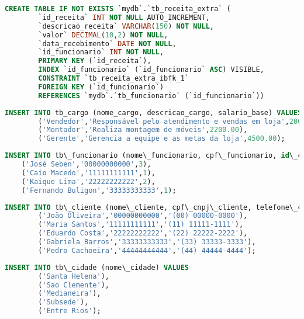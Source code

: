 \documentclass[
12pt,
a4paper,
semrecuonosumario,
sumario = abnt-6027-2012]{report}
\begin{document}
    \begin{lstlisting}[language=SQL,caption={DDL -- Tabela \texttt{tb\_receita\_extra}}]
    	CREATE TABLE IF NOT EXISTS `mydb`.`tb_receita_extra` (
    	`id_receita` INT NOT NULL AUTO_INCREMENT,
    	`descricao_receita` VARCHAR(150) NOT NULL,
    	`valor` DECIMAL(10,2) NOT NULL,
    	`data_recebimento` DATE NOT NULL,
    	`id_funcionario` INT NOT NULL,
    	PRIMARY KEY (`id_receita`),
    	INDEX `id_funcionario` (`id_funcionario` ASC) VISIBLE,
    	CONSTRAINT `tb_receita_extra_ibfk_1`
    	FOREIGN KEY (`id_funcionario`)
    	REFERENCES `mydb`.`tb_funcionario` (`id_funcionario`))
    \end{lstlisting}
    \begin{lstlisting}[language=SQL,caption={DML -- Tabela \texttt{tb\_cargo}}]
        INSERT INTO tb_cargo (nome_cargo, descricao_cargo, salario_base) VALUES
        ('Vendedor','Responsável pelo atendimento e vendas em loja',2000.00),
        ('Montador','Realiza montagem de móveis',2200.00),
        ('Gerente','Gerencia a equipe e as metas da loja',4500.00);
    \end{lstlisting}
    \begin{lstlisting}[language=SQL,caption={DML -- Tabela \texttt{tb\_funcionario}}]
    INSERT INTO tb\_funcionario (nome\_funcionario, cpf\_funcionario, id\_cargo) VALUES
    ('José Seben','00000000000',3),
    ('Caio Macedo','11111111111',1),
    ('Kaique Lima','22222222222',2),
    ('Fernando Buligon','33333333333',1);
    \end{lstlisting}
    
    \begin{lstlisting}[language=SQL,caption={DML -- Tabela \texttt{tb\_cliente}}]
        INSERT INTO tb\_cliente (nome\_cliente, cpf\_cnpj\_cliente, telefone\_cliente) VALUES
        ('João Oliveira','00000000000','(00) 00000-0000'),
        ('Maria Santos','11111111111','(11) 11111-1111'),
        ('Eduardo Costa','22222222222','(22) 22222-2222'),
        ('Gabriela Barros','33333333333','(33) 33333-3333'),
        ('Pedro Cachoeira','44444444444','(44) 44444-4444');
    \end{lstlisting}
    
    \begin{lstlisting}[language=SQL,caption={DML -- Tabela \texttt{tb\_cidade}}]
        INSERT INTO tb\_cidade (nome\_cidade) VALUES
        ('Santa Helena'),
        ('Sao Clemente'),
        ('Medianeira'),
        ('Subsede'),
        ('Entre Rios');
    \end{lstlisting}
    
\end{document}

